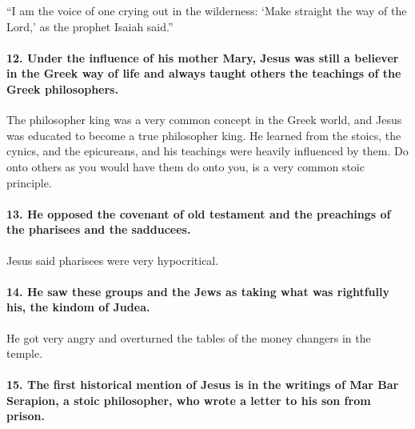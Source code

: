 ``I am the voice of one crying out in the wilderness: `Make straight the way of the Lord,' as the prophet Isaiah said.''

\paragraph{12.
Under the influence of his mother Mary, Jesus was still a believer in the Greek way of life and always taught others the teachings of the Greek philosophers.}\label{par:under-the-influence-of-his-mother-mary-jesus-was-still-a-believer-in-the-greek-way-of-life-and-always-taught-others-the-teachings-of-the-greek-philosophers.}

The philosopher king was a very common concept in the Greek world, and Jesus was educated to become a true philosopher king.
He learned from the stoics, the cynics, and the epicureans, and his teachings were heavily influenced by them.
Do onto others as you would have them do onto you, is a very common stoic principle.

\paragraph{13.
He opposed the covenant of old testament and the preachings of the pharisees and the sadducees.}\label{par:he-opposed-the-covenant-of-old-testament-and-the-preachings-of-the-pharisees-and-the-sadducees.}

Jesus said pharisees were very hypocritical.

\paragraph{14.
He saw these groups and the Jews as taking what was rightfully his, the kindom of Judea.}\label{par:he-saw-these-groups-and-the-jews-as-taking-what-was-rightfully-his-the-kindom-of-judea.}

He got very angry and overturned the tables of the money changers in the temple.

\paragraph{15.
The first historical mention of Jesus is in the writings of Mar Bar Serapion, a stoic philosopher, who wrote a letter to his son from prison.}\label{par:the-first-historical-mention-of-jesus-is-in-the-writings-of-mar-bar-serapion-a-stoic-philosopher-who-wrote-a-letter-to-his-son-from-prison.}

